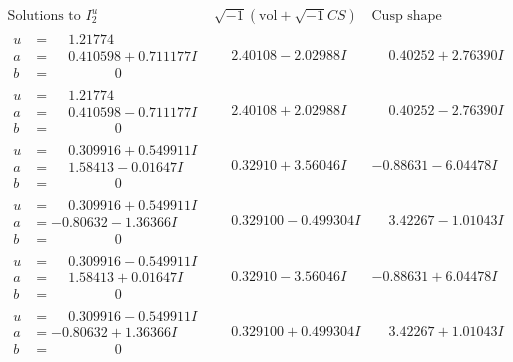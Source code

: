 \documentclass[1p]{elsarticle_modified}
\theoremstyle{definition}
\newcommand{\I}{\sqrt{-1}}
\begin{document}
$$\begin{array}{c|c|c}  
\text{Solutions to }I^u_{2}& \I (\text{vol} + \sqrt{-1}CS) & \text{Cusp shape}\\
 \hline 
\begin{aligned}
u &= \phantom{-}1.21774\phantom{ +0.000000I} \\
a &= \phantom{-}0.410598 + 0.711177 I \\
b &= \phantom{-0.000000 } 0\end{aligned}
 & \phantom{-}2.40108 - 2.02988 I & \phantom{-}0.40252 + 2.76390 I \\ \hline\begin{aligned}
u &= \phantom{-}1.21774\phantom{ +0.000000I} \\
a &= \phantom{-}0.410598 - 0.711177 I \\
b &= \phantom{-0.000000 } 0\end{aligned}
 & \phantom{-}2.40108 + 2.02988 I & \phantom{-}0.40252 - 2.76390 I \\ \hline\begin{aligned}
u &= \phantom{-}0.309916 + 0.549911 I \\
a &= \phantom{-}1.58413 - 0.01647 I \\
b &= \phantom{-0.000000 } 0\end{aligned}
 & \phantom{-}0.32910 + 3.56046 I & -0.88631 - 6.04478 I \\ \hline\begin{aligned}
u &= \phantom{-}0.309916 + 0.549911 I \\
a &= -0.80632 - 1.36366 I \\
b &= \phantom{-0.000000 } 0\end{aligned}
 & \phantom{-}0.329100 - 0.499304 I & \phantom{-}3.42267 - 1.01043 I \\ \hline\begin{aligned}
u &= \phantom{-}0.309916 - 0.549911 I \\
a &= \phantom{-}1.58413 + 0.01647 I \\
b &= \phantom{-0.000000 } 0\end{aligned}
 & \phantom{-}0.32910 - 3.56046 I & -0.88631 + 6.04478 I \\ \hline\begin{aligned}
u &= \phantom{-}0.309916 - 0.549911 I \\
a &= -0.80632 + 1.36366 I \\
b &= \phantom{-0.000000 } 0\end{aligned}
 & \phantom{-}0.329100 + 0.499304 I & \phantom{-}3.42267 + 1.01043 I \\ \hline\begin{aligned}

\end{aligned}
\end{array}$$
\end{document}
